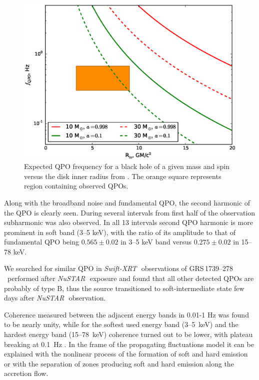 \documentclass[a4paper,fleqn,usenatbib]{mnras}
\def\grs{{GRS\,1739--278\,}}
\def\swiftx{{\em Swift-XRT\,}}
\def\nustar{{\em NuSTAR\,}}
\begin{document}
\begin{figure}
        \includegraphics[width=\columnwidth]{qpoconstr_v03.eps}
        \caption{Expected QPO frequency for a black hole of a given mass and spin versus the disk inner radius from \protect\cite{ingram14}. The orange square represents region containing observed QPOs.}
        \label{fig:qpoconstr}
\end{figure}

Along with the broadband noise and fundamental QPO, the second harmonic of the QPO is clearly seen. 
During several intervals from first half of the observation subharmonic was also observed. 
In all 13 intervals second QPO harmonic is more prominent in soft band (3--5 keV), with the ratio of its amplitude to that of fundamental QPO being $0.565\pm0.02$ in 3--5 keV band versus $0.275\pm0.02$ in 15--78 keV.


We searched for similar QPO in \swiftx\ observations of \grs\ performed after \nustar\, exposure and found that all other detected QPOs are probably of type B, thus the source transitioned to soft-intermediate state few days after \nustar\ observation.

Coherence measured between the adjacent energy bands in 0.01-1 Hz was found to be nearly unity, while for the softest used energy band (3--5~keV) and the hardest energy band (15--78~keV) coherence turned out to be lower, with plateau breaking at 0.1~Hz . 
In the frame of the propagating fluctuations model it can be explained with the nonlinear process of the formation of soft and hard emission or with the separation of zones producing soft and hard emission along the accretion flow.
\end{document}
